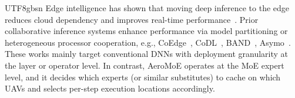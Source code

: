 \documentclass[journal]{IEEEtran}
\begin{document}
\begin{CJK*}{UTF8}{gbsn}
Edge intelligence has shown that moving deep inference to the edge reduces cloud dependency and improves real-time performance~\cite{zhou2019edge}. Prior collaborative inference systems enhance performance via model partitioning or heterogeneous processor cooperation, e.g., CoEdge~\cite{zeng2020coedge}, CoDL~\cite{jia2022codl}, BAND~\cite{jeong2022band}, Asymo~\cite{wang2021asymo}. These works mainly target conventional DNNs with deployment granularity at the layer or operator level. In contrast, AeroMoE operates at the MoE expert level, and it decides which experts (or similar substitutes) to cache on which UAVs and selects per-step execution locations accordingly. %


\end{CJK*}
\end{document}
